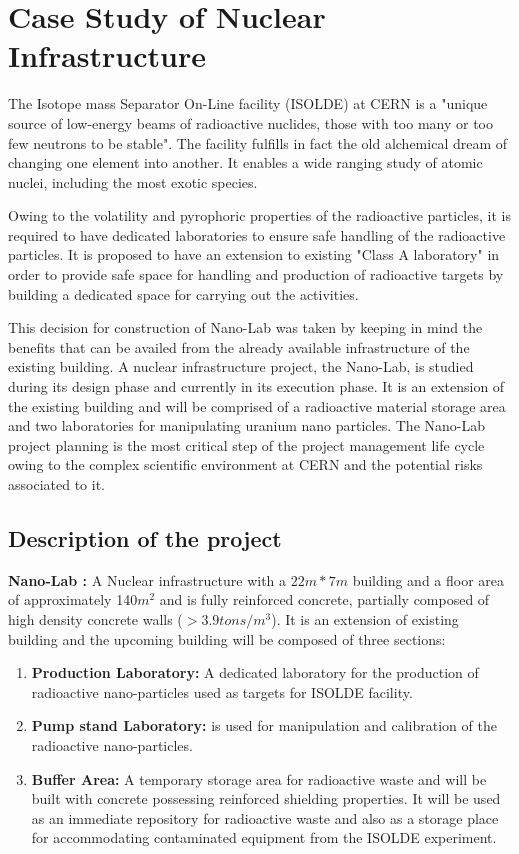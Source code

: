 \let\textcircled=\pgftextcircled
\chapter{Case Study of Nuclear Infrastructure}
\label{chap:chap5}
The Isotope mass Separator On-Line facility (ISOLDE)\cite{Garcia_Ruiz_2020} at CERN is a "unique source of low-energy beams of radioactive nuclides, those with too many or too few neutrons to be stable". The facility fulfills in fact the old alchemical dream of changing one element into another. It enables  a wide ranging study of atomic nuclei, including the most exotic species. 

Owing to the volatility and pyrophoric properties of the radioactive particles, it is required to have dedicated laboratories to ensure safe handling of the radioactive particles. It is proposed to have an extension to existing "Class A laboratory" \cite{iaea} in order to provide safe space for handling and production of radioactive targets by building a dedicated space for carrying out the activities.

This decision for construction of Nano-Lab was taken by keeping in mind the benefits that can be availed from the already available infrastructure of the existing building.  A nuclear infrastructure project, the Nano-Lab, is studied during its design phase and currently in its execution phase. It is an extension of the existing building and will be comprised of a radioactive material storage area and two laboratories for manipulating uranium nano particles. The Nano-Lab project planning is the most critical step of the project management life cycle owing to the complex scientific environment at CERN and the potential risks associated to it. 

\section{Description of the project}

\textbf{Nano-Lab :}  A Nuclear infrastructure with a $22m * 7m$ building and a floor area of approximately 140$m^{2}$ and is fully reinforced concrete, partially composed of high density concrete walls ($> 3.9 tons/m^{3}$). It is an extension of existing building and the upcoming building will be composed of three sections:

\begin{enumerate}
	\item \textbf{Production Laboratory:} A dedicated laboratory for the production of radioactive nano-particles used as targets for ISOLDE facility.
	
	\item \textbf{Pump stand Laboratory:} is used for manipulation and calibration of the radioactive nano-particles.
	
	\item \textbf{Buffer Area:} A temporary storage area for radioactive waste and will be built with concrete possessing reinforced shielding properties. It will be used as an immediate repository for radioactive waste and also as a storage place for accommodating contaminated equipment from the ISOLDE experiment.
\end{enumerate}

